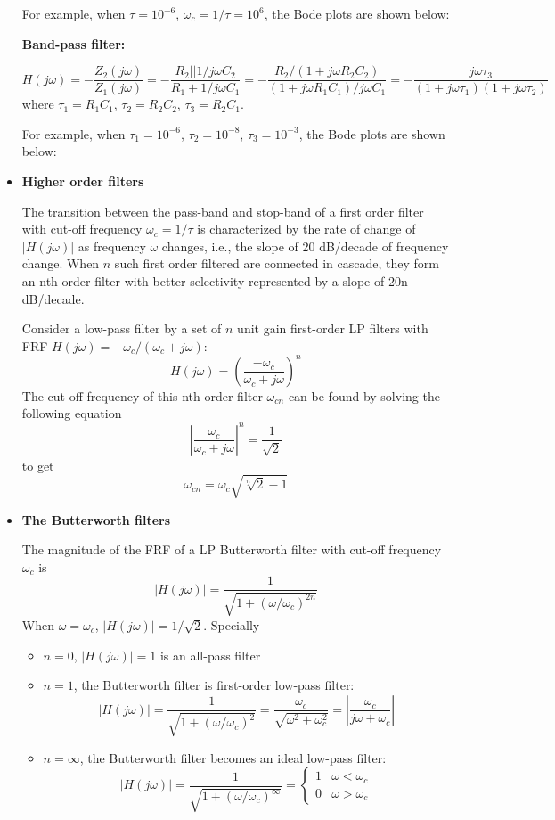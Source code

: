 \begin{itemize}
For example, when $\tau=10^{-6}$, $\omega_c=1/\tau=10^6$, the Bode plots are 
shown below:


{\bf Band-pass filter:}


\[
H(j\omega)=-\frac{Z_2(j\omega)}{Z_1(j\omega)}
=-\frac{R_2||1/j\omega C_2}{R_1+1/j\omega C_1}
=-\frac{R_2/(1+j\omega R_2C_2)}{(1+j\omega R_1C_1)/j\omega C_1}
=-\frac{j\omega \tau_3}{(1+j\omega \tau_1)(1+j\omega \tau_2)} 
\]
where $\tau_1=R_1C_1$, $\tau_2=R_2C_2$, $\tau_3=R_2C_1$.

For example, when $\tau_1=10^{-6}$, $\tau_2=10^{-8}$, $\tau_3=10^{-3}$, the Bode
plots are shown below:


\item {\bf Higher order filters}

The transition between the pass-band and stop-band of a first order 
filter with cut-off frequency $\omega_c=1/\tau$ is characterized by the 
rate of change of $|H(j\omega)|$ as frequency $\omega$ changes, i.e., 
the slope of 20 dB/decade of frequency change. When $n$ such first order 
filtered are connected in cascade, they form an nth order filter with 
better selectivity represented by a slope of 20n dB/decade. 

Consider a low-pass filter by a set of $n$ unit gain first-order LP 
filters with FRF $H(j\omega)=-\omega_c/(\omega_c+j\omega)$:
\[
H(j\omega)=\left(\frac{-\omega_c}{\omega_c+j\omega} \right)^n
\]
The cut-off frequency of this nth order filter $\omega_{cn}$ can be
found by solving the following equation
\[
\left|\frac{\omega_c}{\omega_c+j\omega}\right|^n=\frac{1}{\sqrt{2}}
\]
to get
\[
\omega_{cn}=\omega_c\sqrt{\sqrt[n]{2}-1}
\]

\item {\bf The Butterworth filters}

The magnitude of the FRF of a LP Butterworth filter with cut-off frequency 
$\omega_c$ is
\[
\left| H(j\omega)\right|=\frac{1}{\sqrt{1+(\omega/\omega_c)^{2n}}}
\]
When $\omega=\omega_c$, $|H(j\omega)|=1/\sqrt{2}$. Specially 
\begin{itemize}
\item $n=0$, $|H(j\omega)|=1$ is an all-pass filter
\item $n=1$, the Butterworth filter is first-order low-pass filter:
  \[
  |H(j\omega)|=\frac{1}{\sqrt{1+(\omega/\omega_c)^2}}
  =\frac{\omega_c}{\sqrt{\omega^2+\omega_c^2}}
  =\left|\frac{\omega_c}{j\omega+\omega_c}\right|
  \]
\item $n=\infty$, the Butterworth filter becomes an ideal low-pass
  filter:
  \[
  |H(j\omega)|=\frac{1}{\sqrt{1+(\omega/\omega_c)^\infty}}  
  =\left\{\begin{array}{ll}1&\omega<\omega_c\\0&\omega>\omega_c\end{array}
  \right.
  \]
\end{itemize}


\end{itemize}
